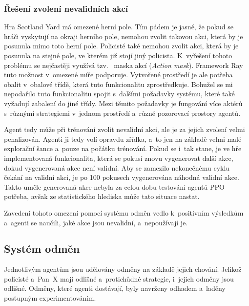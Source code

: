 \subsubsection*{Řešení zvolení nevalidních akcí}
\label{subsubsec:nevalidni_akce}

Hra Scotland Yard má omezené herní pole.
Tím pádem je jasné, že pokud se hráči vyskytují na okraji herního pole, nemohou zvolit takovou akci, která by je posunula mimo toto herní pole.
Policisté také nemohou zvolit akci, která by je posunula na stejné pole, ve kterém již stojí jiný policista.
K~vyřešení tohoto problému se nejčastěji využívá tzv.~ maska akcí (\emph{Action mask}).
Framework Ray tuto možnost v~omezené míře podporuje.
Vytvořené prostředí je ale potřeba obalit v~obalové třídě, která tuto funkcionalitu zprostředkuje.
Bohužel se mi nepodařilo tuto funkcionalitu spojit s~dalšími požadavky systému, které také vyžadují zabalení do jiné třídy.
Mezi těmito požadavky je fungování více aktérů s~různými strategiemi v~jednom prostředí a~různé pozorovací prostory agentů.

Agent tedy může při trénování zvolit nevalidní akci, ale je za jejich zvolení velmi penalizován.
Agenti ji tedy volí opravdu zřídka, a~to jen na základě velmi malé explorační šance a~pouze na počátku trénování.
Pokud se i~tak stane, je ve hře implementovaná funkcionalita, která se pokusí znovu vygenerovat další akce, dokud vygenerovaná akce není validní.
Aby se zamezilo nekonečnému cyklu čekání na validní akci, je po 100 pokusech vygenerována náhodná validní akce.
Takto uměle generovaná akce nebyla za celou dobu testování agentů PPO potřeba, avšak ze statistického hlediska může tato situace nastat.

Zavedení tohoto omezení pomocí systému odměn vedlo k~positivním výsledkům a~agenti se naučili, jaké akce jsou nevalidní, a~nepoužívají je.

\subsection{Systém odměn}
\label{subsec:odmeny}

Jednotlivým agentům jsou udělovány odměny na základě jejich chování.
Jelikož policisté a~Pan~X mají odlišné a~protichůdné strategie, i~jejich odměny jsou odlišné.
Odměny, které agenti dostávají, byly navrženy odhadem a~laděny postupným experimentováním.

\bigskip

